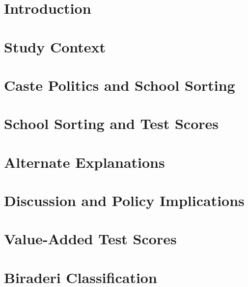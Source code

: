 \documentclass[11pt]{article}
\begin{document}
\setcounter{page}{1}


\section{Introduction}\label{pk_intro}

	

\section{Study Context}\label{pk_context}

	

\section{Caste Politics and School Sorting}\label{pk_sorting} %

	


\section{School Sorting and Test Scores}\label{pk_scores}

	


\section{Alternate Explanations}\label{pk_alternatives}

	

\section{Discussion and Policy Implications}\label{pk_conclusion}

	

\pagebreak

	
	

\appendix

\section{Value-Added Test Scores}\label{appendix_valueadded}

	
\clearpage
\section{Biraderi Classification}\label{appendix_classification}

	
\end{document}
